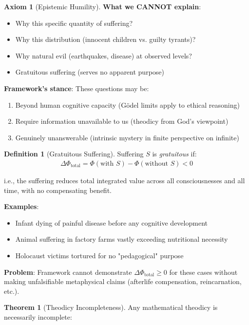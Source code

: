 \documentclass[11pt,a4paper]{article}
\theoremstyle{definition}
\newtheorem{definition}{Definition}[section]
\newtheorem{theorem}{Theorem}[section]
\newtheorem{axiom}{Axiom}[section]
\theoremstyle{remark}
\begin{document}
\begin{enumerate}
\begin{axiom}[Epistemic Humility]
\textbf{What we CANNOT explain}:
\begin{itemize}
    \item Why this specific quantity of suffering?
    \item Why this distribution (innocent children vs. guilty tyrants)?
    \item Why natural evil (earthquakes, disease) at observed levels?
    \item Gratuitous suffering (serves no apparent purpose)
\end{itemize}

\textbf{Framework's stance}: These questions may be:
\begin{enumerate}
    \item Beyond human cognitive capacity (Gödel limits apply to ethical reasoning)
    \item Require information unavailable to us (theodicy from God's viewpoint)
    \item Genuinely unanswerable (intrinsic mystery in finite perspective on infinite)
\end{enumerate}
\end{axiom}

\begin{definition}[Gratuitous Suffering]
Suffering \(S\) is \textit{gratuitous} if:
\begin{align}
\Delta \Phi_{\text{total}} = \Phi(\text{with } S) - \Phi(\text{without } S) < 0
\end{align}

i.e., the suffering reduces total integrated value across all consciousnesses and all time, with no compensating benefit.

\textbf{Examples}:
\begin{itemize}
    \item Infant dying of painful disease before any cognitive development
    \item Animal suffering in factory farms vastly exceeding nutritional necessity
    \item Holocaust victims tortured for no "pedagogical" purpose
\end{itemize}

\textbf{Problem}: Framework cannot demonstrate \(\Delta \Phi_{\text{total}} \geq 0\) for these cases without making unfalsifiable metaphysical claims (afterlife compensation, reincarnation, etc.).
\end{definition}

\begin{theorem}[Theodicy Incompleteness]
Any mathematical theodicy is necessarily incomplete:


\end{theorem}
\end{enumerate}
\end{document}
